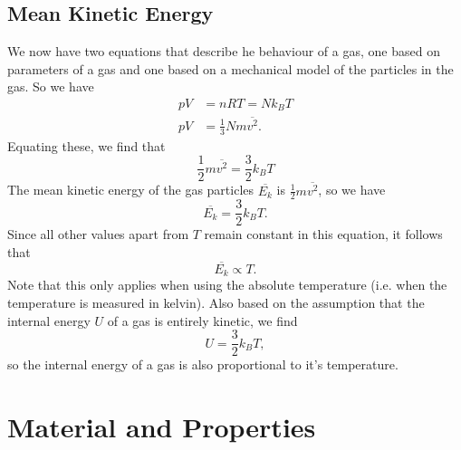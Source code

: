 \subsection{Mean Kinetic Energy}

We now have two equations that describe he behaviour of a gas, one based on parameters of a gas and one based on a mechanical model of the particles in the gas. So we have
\begin{align*}
    pV &= nRT = N k_B T \\
    pV &= \frac{1}{3} Nm\overline{v^2}.
\end{align*}
Equating these, we find that
\begin{equation*}
    \frac{1}{2} m \overline{v^2} = \frac{3}{2} k_B T
\end{equation*}
The mean kinetic energy of the gas particles $\overline{E_k}$ is $\frac{1}{2} m \overline{v^2}$, so we have
\begin{equation}
    \overline{E_k} = \frac{3}{2} k_B T.
\end{equation}
Since all other values apart from $T$ remain constant in this equation, it follows that
\begin{equation}
    \overline{E_k} \propto T.
\end{equation}
Note that this only applies when using the absolute temperature (i.e. when the temperature is measured in kelvin). Also based on the assumption that the internal energy $U$ of a gas is entirely kinetic, we find
\begin{equation}
    U = \frac{3}{2} k_B T,
\end{equation}
so the internal energy of a gas is also proportional to it's temperature. 

\section{Material and Properties}